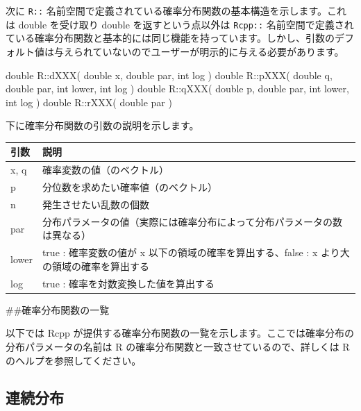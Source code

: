 \documentclass[]{book}
\newenvironment{Shaded}{\begin{snugshade}}{\end{snugshade}}
\newcommand{\DataTypeTok}[1]{\textcolor[rgb]{0.13,0.29,0.53}{#1}}
\newcommand{\NormalTok}[1]{#1}
\begin{document}
次に \texttt{R::} 名前空間で定義されている確率分布関数の基本構造を示します。これは double を受け取り double を返すという点以外は \texttt{Rcpp::} 名前空間で定義されている確率分布関数と基本的には同じ機能を持っています。しかし、引数のデフォルト値は与えられていないのでユーザーが明示的に与える必要があります。

\begin{Shaded}
\begin{Highlighting}[]
\DataTypeTok{double}\NormalTok{ R::dXXX( }\DataTypeTok{double}\NormalTok{ x, }\DataTypeTok{double}\NormalTok{ par,            }\DataTypeTok{int}\NormalTok{ log )}
\DataTypeTok{double}\NormalTok{ R::pXXX( }\DataTypeTok{double}\NormalTok{ q, }\DataTypeTok{double}\NormalTok{ par, }\DataTypeTok{int}\NormalTok{ lower, }\DataTypeTok{int}\NormalTok{ log )}
\DataTypeTok{double}\NormalTok{ R::qXXX( }\DataTypeTok{double}\NormalTok{ p, }\DataTypeTok{double}\NormalTok{ par, }\DataTypeTok{int}\NormalTok{ lower, }\DataTypeTok{int}\NormalTok{ log )}
\DataTypeTok{double}\NormalTok{ R::rXXX(           }\DataTypeTok{double}\NormalTok{ par )}
\end{Highlighting}
\end{Shaded}

下に確率分布関数の引数の説明を示します。

\begin{longtable}[]{@{}ll@{}}
\toprule
引数 & 説明\tabularnewline
\midrule
\endhead
x, q & 確率変数の値（のベクトル）\tabularnewline
p & 分位数を求めたい確率値（のベクトル）\tabularnewline
n & 発生させたい乱数の個数\tabularnewline
par & 分布パラメータの値（実際には確率分布によって分布パラメータの数は異なる）\tabularnewline
lower & true : 確率変数の値が x 以下の領域の確率を算出する、false : x より大の領域の確率を算出する\tabularnewline
log & true : 確率を対数変換した値を算出する\tabularnewline
\bottomrule
\end{longtable}

\#\#確率分布関数の一覧

以下では Rcpp が提供する確率分布関数の一覧を示します。ここでは確率分布の分布パラメータの名前は R の確率分布関数と一致させているので、詳しくは R のヘルプを参照してください。

\subsection{連続分布}
\end{document}

